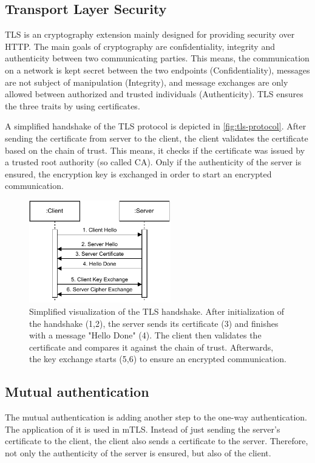 \subsection{Transport Layer Security}
\ac{TLS} is an cryptography extension mainly designed for providing security over \ac{HTTP}. The main goals of cryptography are confidentiality, integrity and authenticity between two communicating parties. This means, the communication on a network is kept secret between the two endpoints (Confidentiality), messages are not subject of manipulation (Integrity), and message exchanges are only allowed between authorized and trusted individuals (Authenticity). \ac{TLS} ensures the three traits by using certificates.

A simplified handshake of the \ac{TLS} protocol is depicted in \autoref{fig:tls-protocol}.
After sending the certificate from server to the client, the client validates the certificate based on the chain of trust. This means, it checks if the certificate was issued by a trusted root authority (so called \ac{CA}). Only if the authenticity of the server is ensured, the encryption key is exchanged in order to start an encrypted communication.

\begin{figure}[h]
	\centering
	\includegraphics[width=0.55\textwidth]{Figures/tls.pdf}
	\caption{Simplified visualization of the \ac{TLS} handshake. After initialization of the handshake (1,2), the server sends its certificate (3) and finishes with a message "Hello Done" (4). The client then validates the certificate and compares it against the chain of trust. Afterwards, the key exchange starts (5,6) to ensure an encrypted communication.}
	\label{fig:tls-protocol}
\end{figure}


\subsection{Mutual authentication}
The mutual authentication is adding another step to the one-way authentication. The application of it is used in \ac{mTLS}. Instead of just sending the server's certificate to the client, the client also sends a certificate to the server. Therefore, not only the authenticity of the server is ensured, but also of the client.

